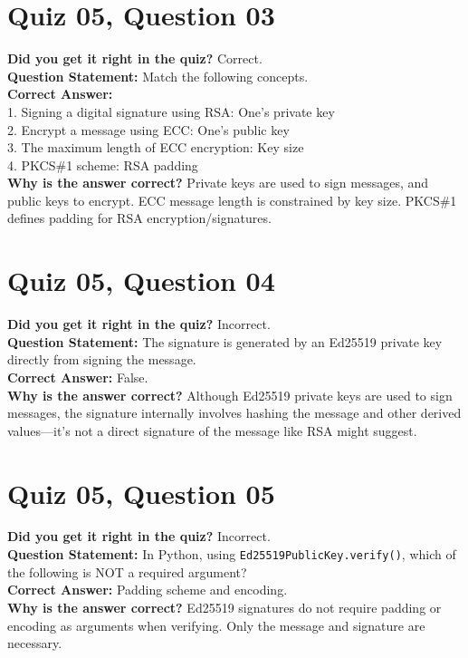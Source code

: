 \documentclass{article}
\begin{document}
\vspace{1em}

\section*{Quiz 05, Question 03}
\textbf{Did you get it right in the quiz?} Correct. \\
\textbf{Question Statement:} Match the following concepts. \\
\textbf{Correct Answer:} \\
1. Signing a digital signature using RSA: One's private key \\
2. Encrypt a message using ECC: One's public key \\
3. The maximum length of ECC encryption: Key size \\
4. PKCS\#1 scheme: RSA padding \\
\textbf{Why is the answer correct?} Private keys are used to sign messages, and public keys to encrypt. ECC message length is constrained by key size. PKCS\#1 defines padding for RSA encryption/signatures.

\vspace{1em}

\section*{Quiz 05, Question 04}
\textbf{Did you get it right in the quiz?} Incorrect. \\
\textbf{Question Statement:} The signature is generated by an Ed25519 private key directly from signing the message. \\
\textbf{Correct Answer:} False. \\
\textbf{Why is the answer correct?} Although Ed25519 private keys are used to sign messages, the signature internally involves hashing the message and other derived values—it's not a direct signature of the message like RSA might suggest.

\vspace{1em}

\section*{Quiz 05, Question 05}
\textbf{Did you get it right in the quiz?} Incorrect. \\
\textbf{Question Statement:} In Python, using \texttt{Ed25519PublicKey.verify()}, which of the following is NOT a required argument? \\
\textbf{Correct Answer:} Padding scheme and encoding. \\
\textbf{Why is the answer correct?} Ed25519 signatures do not require padding or encoding as arguments when verifying. Only the message and signature are necessary.
\end{document}
